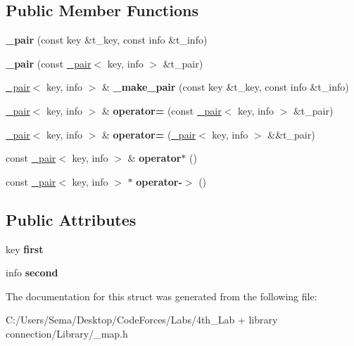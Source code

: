 \subsection*{Public Member Functions}
\begin{DoxyCompactItemize}
\item 
\mbox{\label{struct__pair_a2d8582c344341d37595d71d0bd9d4c0f}} 
{\bfseries \+\_\+pair} (const key \&t\+\_\+key, const info \&t\+\_\+info)
\item 
\mbox{\label{struct__pair_ae2313b7dca4020743f7e36f66daa9e6c}} 
{\bfseries \+\_\+pair} (const \mbox{\hyperlink{struct__pair}{\+\_\+pair}}$<$ key, info $>$ \&t\+\_\+pair)
\item 
\mbox{\label{struct__pair_a53607c8d4c3e171bd27105eb763dcbdf}} 
\mbox{\hyperlink{struct__pair}{\+\_\+pair}}$<$ key, info $>$ \& {\bfseries \+\_\+make\+\_\+pair} (const key \&t\+\_\+key, const info \&t\+\_\+info)
\item 
\mbox{\label{struct__pair_ae459d706ae4b2dff62b65b4c3ed6fcd3}} 
\mbox{\hyperlink{struct__pair}{\+\_\+pair}}$<$ key, info $>$ \& {\bfseries operator=} (const \mbox{\hyperlink{struct__pair}{\+\_\+pair}}$<$ key, info $>$ \&t\+\_\+pair)
\item 
\mbox{\label{struct__pair_a57a0413e35f985651dc043b5f05d14f1}} 
\mbox{\hyperlink{struct__pair}{\+\_\+pair}}$<$ key, info $>$ \& {\bfseries operator=} (\mbox{\hyperlink{struct__pair}{\+\_\+pair}}$<$ key, info $>$ \&\&t\+\_\+pair)
\item 
\mbox{\label{struct__pair_a123a7544157c973429552db3f2603433}} 
const \mbox{\hyperlink{struct__pair}{\+\_\+pair}}$<$ key, info $>$ \& {\bfseries operator$\ast$} ()
\item 
\mbox{\label{struct__pair_a3704a4ada0cb96a307aacecd0993ad01}} 
const \mbox{\hyperlink{struct__pair}{\+\_\+pair}}$<$ key, info $>$ $\ast$ {\bfseries operator-\/$>$} ()
\end{DoxyCompactItemize}
\subsection*{Public Attributes}
\begin{DoxyCompactItemize}
\item 
\mbox{\label{struct__pair_a261c3a7bc0c2157e8cc2f9a75fd6d0b9}} 
key {\bfseries first}
\item 
\mbox{\label{struct__pair_a0833ec662e914d84d8bc269e57bef95a}} 
info {\bfseries second}
\end{DoxyCompactItemize}


The documentation for this struct was generated from the following file\+:\begin{DoxyCompactItemize}
\item 
C\+:/\+Users/\+Sema/\+Desktop/\+Code\+Forces/\+Labs/4th\+\_\+\+Lab + library connection/\+Library/\+\_\+map.\+h\end{DoxyCompactItemize}
